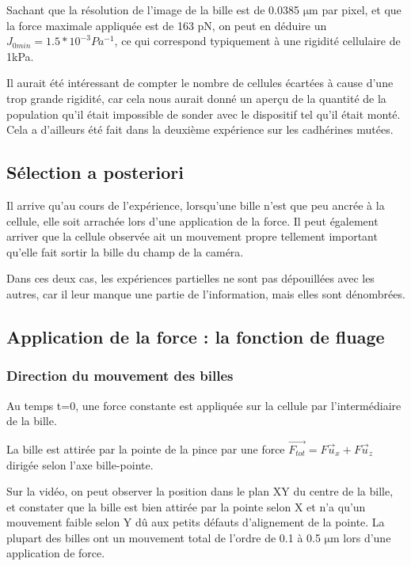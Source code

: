 \documentclass{report}
\newcommand{\micro}{$\mathrm{\mu}$}
\begin{document}
Sachant que la résolution de l'image de la bille est de 0.0385 \micro m par pixel, et que la force maximale appliquée est de 163 pN, on peut en déduire un $J_{0min}=1.5 *10^{-3} Pa^{-1}$, ce qui correspond typiquement à une rigidité cellulaire de 1kPa. 

Il aurait été intéressant de compter le nombre de cellules écartées à cause d'une trop grande rigidité, car cela nous aurait donné un aperçu de la quantité de la population qu'il était impossible de sonder avec le dispositif tel qu'il était monté. Cela a d'ailleurs été fait dans la deuxième expérience sur les cadhérines mutées. 

\subsection{Sélection a posteriori}

Il arrive qu'au cours de l'expérience, lorsqu'une bille n'est que peu ancrée à la cellule, elle soit arrachée lors d'une application de la force.
Il peut également arriver que la cellule observée ait un mouvement propre tellement important qu'elle fait sortir la bille du  champ de la caméra. 

Dans ces deux cas, les expériences partielles ne sont pas dépouillées avec les autres, car il leur manque une partie de l'information, mais elles sont dénombrées.

\subsection{Application de la force : la fonction de fluage}

\subsubsection{Direction du mouvement des billes}
Au temps t=0, une force constante est appliquée sur la cellule par l'intermédiaire de la bille. 

La bille est attirée par la pointe de la pince par une force $\vec{F_{tot}}=F \vec{u}_x+F\vec{u}_z$ dirigée selon l'axe bille-pointe. 

Sur la vidéo, on peut observer la position dans le plan XY du centre de la bille, et constater que la bille est bien attirée par la pointe selon X et n'a qu'un mouvement faible selon Y dû aux petits défauts d'alignement de la pointe. La plupart des billes ont un mouvement total de l'ordre de 0.1 à 0.5 \micro m lors d'une application de force. 
\end{document}

